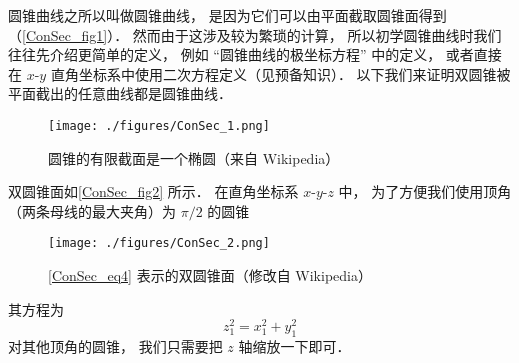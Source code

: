 

圆锥曲线之所以叫做圆锥曲线， 是因为它们可以由平面截取圆锥面得到（\autoref{ConSec_fig1}）． 然而由于这涉及较为繁琐的计算， 所以初学圆锥曲线时我们往往先介绍更简单的定义， 例如 “圆锥曲线的极坐标方程” 中的定义， 或者直接在 $x$-$y$ 直角坐标系中使用二次方程定义（见预备知识）． 以下我们来证明双圆锥被平面截出的任意曲线都是圆锥曲线．

\begin{figure}[ht]
\centering
\texttt{[image: ./figures/ConSec\_1.png]}
\caption{圆锥的有限截面是一个椭圆（来自 Wikipedia）} \label{ConSec_fig1}
\end{figure}

双圆锥面如\autoref{ConSec_fig2} 所示． 在直角坐标系 $x$-$y$-$z$ 中， 为了方便我们使用顶角（两条母线的最大夹角）为 $\pi/2$ 的圆锥
\begin{figure}[ht]
\centering
\texttt{[image: ./figures/ConSec\_2.png]}
\caption{\autoref{ConSec_eq4} 表示的双圆锥面（修改自 Wikipedia）} \label{ConSec_fig2}
\end{figure}
其方程为
\begin{equation}\label{ConSec_eq4}
z_1^2 = x_1^2 + y_1^2
\end{equation}
对其他顶角的圆锥， 我们只需要把 $z$ 轴缩放一下即可．

